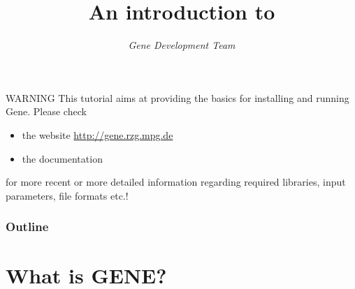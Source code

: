 \documentclass[10pt]{beamer}
\title{An introduction to \gene}
\author{{\it Gene Development Team}}
\institute{\href{mailto:gene@ipp.mpg.de}{gene@ipp.mpg.de}}
\begin{document}
\begin{frame}[plain]
  \titlepage
\end{frame}


\begin{frame}[plain]
\begin{alertblock}{WARNING}
This tutorial aims at providing the basics for installing and running {\sc Gene}.
Please check
\begin{itemize}
 \item the website \url{http://gene.rzg.mpg.de}
 \item the documentation
\end{itemize}
for more recent or more detailed information regarding required libraries, input parameters, file formats etc.!
\end{alertblock}

\end{frame}



\begin{frame}[plain]
  \frametitle{Outline}

  \tableofcontents

\end{frame}


\section{What is GENE?}
\end{document}
